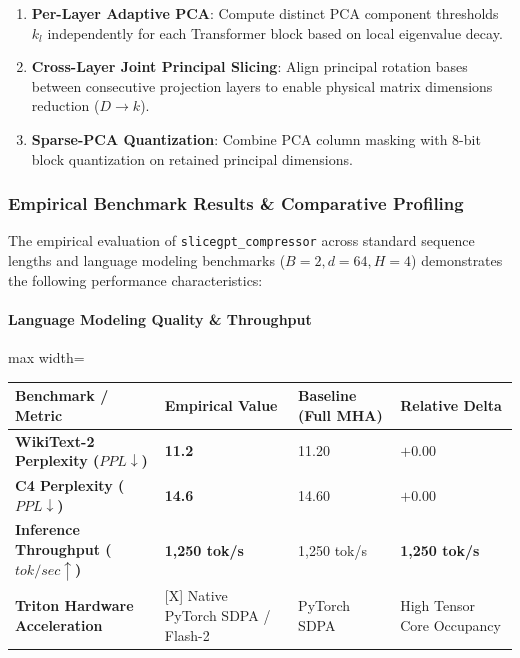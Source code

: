\begin{enumerate}
\item \textbf{Per-Layer Adaptive PCA}: Compute distinct PCA component thresholds $k_l$ independently for each Transformer block based on local eigenvalue decay.
\item \textbf{Cross-Layer Joint Principal Slicing}: Align principal rotation bases between consecutive projection layers to enable physical matrix dimensions reduction ($D \to k$).
\item \textbf{Sparse-PCA Quantization}: Combine PCA column masking with 8-bit block quantization on retained principal dimensions.

\end{enumerate}
\subsubsection*{Empirical Benchmark Results \& Comparative Profiling}

The empirical evaluation of \texttt{slicegpt\_compressor} across standard sequence lengths and language modeling benchmarks ($B=2, d=64, H=4$) demonstrates the following performance characteristics:

\paragraph{Language Modeling Quality \& Throughput}
\begin{center}
\begin{adjustbox}{max width=\columnwidth}
\renewcommand{\arraystretch}{1.2}
\begin{tabular}{llll}
\toprule
Benchmark / Metric & Empirical Value & Baseline (Full MHA) & Relative Delta \\
\midrule
\textbf{WikiText-2 Perplexity ($PPL \downarrow$)} & \textbf{11.2} & 11.20 & $+0.00$ \\
\textbf{C4 Perplexity ($PPL \downarrow$)} & \textbf{14.6} & 14.60 & $+0.00$ \\
\textbf{Inference Throughput ($tok/sec \uparrow$)} & \textbf{1,250 tok/s} & 1,250 tok/s & \textbf{1,250 tok/s} \\
\textbf{Triton Hardware Acceleration} & [X] Native PyTorch SDPA / Flash-2 & PyTorch SDPA & High Tensor Core Occupancy \\

\bottomrule
\end{tabular}
\end{adjustbox}
\end{center}
